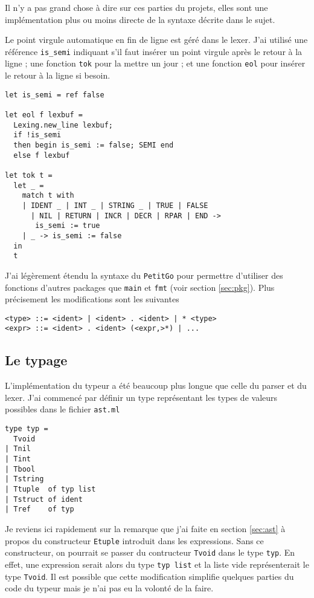 \documentclass[11pt]{article}
\begin{document}
Il n'y a pas grand chose à dire sur ces parties du projets, elles sont une implémentation plus ou moins directe de la syntaxe décrite dans le sujet.

Le point virgule automatique en fin de ligne est géré dans le lexer. J'ai utilisé une référence \texttt{is\_semi} indiquant s'il faut insérer un point virgule après le retour à la ligne ; une fonction \texttt{tok} pour la mettre un jour ; et une fonction \texttt{eol} pour insérer le retour à la ligne si besoin.

\begin{verbatim}
let is_semi = ref false

let eol f lexbuf =
  Lexing.new_line lexbuf;
  if !is_semi
  then begin is_semi := false; SEMI end
  else f lexbuf

let tok t =
  let _ =
    match t with
    | IDENT _ | INT _ | STRING _ | TRUE | FALSE
      | NIL | RETURN | INCR | DECR | RPAR | END ->
       is_semi := true
    | _ -> is_semi := false
  in
  t

\end{verbatim}

J'ai légèrement étendu la syntaxe du \texttt{PetitGo} pour permettre d'utiliser des fonctions d'autres packages que \texttt{main} et \texttt{fmt} (voir section \ref{sec:pkg}). Plus précisement les modifications sont les suivantes

\begin{verbatim}
<type> ::= <ident> | <ident> . <ident> | * <type>
<expr> ::= <ident> . <ident> (<expr,>*) | ...
\end{verbatim}

\subsection{Le typage}

L'implémentation du typeur a été beaucoup plus longue que celle du parser et du lexer. J'ai commencé par définir un type représentant les types de valeurs possibles dans le fichier \texttt{ast.ml}

\begin{verbatim}
type typ =
  Tvoid
| Tnil
| Tint
| Tbool
| Tstring
| Ttuple  of typ list
| Tstruct of ident
| Tref    of typ
\end{verbatim}

Je reviens ici rapidement sur la remarque que j'ai faite en section \ref{sec:ast} à propos du constructeur \texttt{Etuple} introduit dans les expressions. Sans ce constructeur, on pourrait se passer du contructeur \texttt{Tvoid} dans le type \texttt{typ}. En effet, une expression serait alors du type \texttt{typ list} et la liste vide représenterait le type \texttt{Tvoid}. Il est possible que cette modification simplifie quelques parties du code du typeur mais je n'ai pas eu la volonté de la faire.
\end{document}
